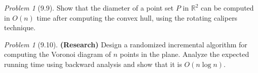 \documentclass[twoside,12pt]{book}
\theoremstyle{plain}
\theoremstyle{definition}
\theoremstyle{remark}
\newtheorem{problem}[theorem]{Problem}
\begin{document}
\begin{problem}[9.9]
Show that the diameter of a point set $P$ in $\mathbb{R}^2$ can be computed in $O(n)$ time after computing the convex hull, using the rotating calipers technique.
\end{problem}

\begin{problem}[9.10]
\textbf{(Research)} Design a randomized incremental algorithm for computing the Voronoi diagram of $n$ points in the plane. Analyze the expected running time using backward analysis and show that it is $O(n \log n)$.
\end{problem}
\end{document}
